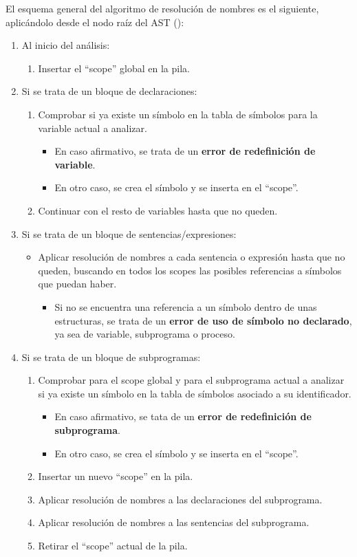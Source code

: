 El esquema general del algoritmo de resolución de nombres es el siguiente, aplicándolo desde el nodo raíz del AST ():
\begin{enumerate}
    \item Al inicio del análisis:
    \begin{enumerate}
        \item Insertar el ``scope'' global en la pila.
    \end{enumerate}
    \item Si se trata de un bloque de declaraciones:
    \begin{enumerate}
        \item Comprobar si ya existe un símbolo en la tabla de símbolos para la variable actual a analizar.
        \begin{itemize}
            \item En caso afirmativo, se trata de un \textbf{error de redefinición de variable}.
            \item En otro caso, se crea el símbolo y se inserta en el ``scope''.
        \end{itemize}
        \item Continuar con el resto de variables hasta que no queden.
    \end{enumerate}
    \item Si se trata de un bloque de sentencias/expresiones:
    \begin{itemize}
        \item Aplicar resolución de nombres a cada sentencia o expresión hasta que no queden, buscando en todos los scopes las posibles referencias a símbolos que puedan haber.
        \begin{itemize}
            \item Si no se encuentra una referencia a un símbolo dentro de unas estructuras, se trata de un \textbf{error de uso de símbolo no declarado}, ya sea de variable, subprograma o proceso.
        \end{itemize}
    \end{itemize}
    \item Si se trata de un bloque de subprogramas:
    \begin{enumerate}
        \item Comprobar para el scope global y para el subprograma actual a analizar si ya existe un símbolo en la tabla de símbolos asociado a su identificador.
        \begin{itemize}
            \item En caso afirmativo, se tata de un \textbf{error de redefinición de subprograma}.
            \item En otro caso, se crea el símbolo y se inserta en el ``scope''.
        \end{itemize}
        \item Insertar un nuevo ``scope'' en la pila.
        \item Aplicar resolución de nombres a las declaraciones del subprograma.
        \item Aplicar resolución de nombres a las sentencias del subprograma.
        \item Retirar el ``scope'' actual de la pila.


\end{enumerate}
\end{enumerate}
